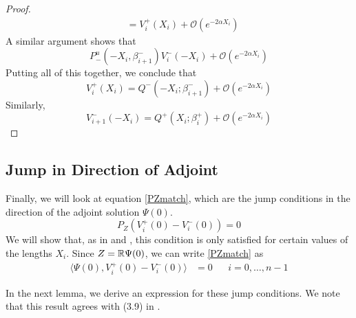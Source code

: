 \documentclass[thesis.tex]{subfiles}
\begin{document}
\begin{lemma}
\begin{proof}
\begin{align*}
&= V_i^+(X_i) + \mathcal{O}(e^{-2 \alpha X_i})
\end{align*}
A similar argument shows that
\[
P^u_-(-X_i, \beta_{i+1}^-) V_i^-(-X_i) + \mathcal{O}(e^{-2 \alpha X_i})
\]
Putting all of this together, we conclude that
\begin{equation*}
V_i^+(X_i) = Q^-(-X_i; \beta_{i+1}^-) + \mathcal{O}(e^{-2 \alpha X_i})
\end{equation*}
Similarly,
\begin{equation*}
V_{i+1}^-(-X_i) = Q^+(X_i; \beta_i^+) + \mathcal{O}(e^{-2 \alpha X_i})
\end{equation*}
\end{proof}
\end{lemma}

\subsection{Jump in Direction of Adjoint}

Finally, we will look at equation \eqref{PZmatch}, which are the jump conditions in the direction of the adjoint solution $\Psi(0)$. 
\[
P_Z(V_i^+(0) - V_i^-(0)) = 0
\]
We will show that, as in \cite{Sandstede1998} and \cite{SandstedeStrut}, this condition is only satisfied for certain values of the lengths $X_i$. Since $Z = {\mathbb R} \Psi(0)$, we can write \eqref{PZmatch} as
\begin{align}\label{PZmatch2}
\langle \Psi(0), V_i^+(0) - V_i^-(0) \rangle &= 0 && i = 0, \dots, n-1
\end{align}

In the next lemma, we derive an expression for these jump conditions. We note that this result agrees with (3.9) in \cite{SandstedeStrut}.

\end{document}
